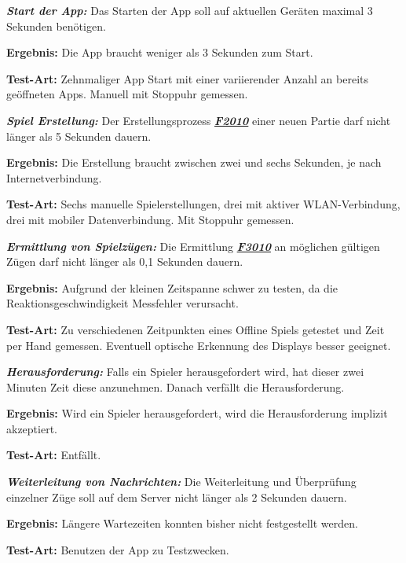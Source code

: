 \documentclass[parskip=full]{scrartcl}
\begin{document}
\begin{description}
	
	\item[NF1010] \textbf{\textit{Start der App: }} Das Starten der App soll auf aktuellen Geräten maximal 3 Sekunden benötigen. 
	\item \textbf{Ergebnis: } Die App braucht weniger als 3 Sekunden zum Start.
	\item \textbf{Test-Art: } Zehnmaliger App Start mit einer variierender Anzahl an bereits geöffneten Apps. Manuell mit Stoppuhr gemessen.
	
	\item[NF1020] \textbf{\textit{Spiel Erstellung: }} Der Erstellungsprozess \hyperlink{F2010}{\textbf{\textit{F2010}}} einer neuen Partie darf nicht länger als 5 Sekunden dauern.
	\item \textbf{Ergebnis: } Die Erstellung braucht zwischen zwei und sechs Sekunden, je nach Internetverbindung.
	\item \textbf{Test-Art: } Sechs manuelle Spielerstellungen, drei mit aktiver WLAN-Verbindung, drei mit mobiler Datenverbindung. Mit Stoppuhr gemessen.
	
	\item[NF1030] \textbf{\textit{Ermittlung von Spielzügen: }} Die Ermittlung \hyperlink{F3010}{\textbf{\textit{F3010}}} an möglichen gültigen Zügen darf nicht länger als 0,1 Sekunden dauern.
	\item \textbf{Ergebnis: } Aufgrund der kleinen Zeitspanne schwer zu testen, da die Reaktionsgeschwindigkeit Messfehler verursacht.
	\item \textbf{Test-Art: } Zu verschiedenen Zeitpunkten eines Offline Spiels getestet und Zeit per Hand gemessen. Eventuell optische Erkennung des Displays besser geeignet.
	
	\item[NF1040] \textbf{\textit{Herausforderung: }} Falls ein Spieler herausgefordert wird, hat dieser zwei Minuten Zeit diese anzunehmen. Danach verfällt die Herausforderung. 
	\item \textbf{Ergebnis: } Wird ein Spieler herausgefordert, wird die Herausforderung implizit akzeptiert.
	\item \textbf{Test-Art: } Entfällt.
	
	\item[NF1050] \textbf{\textit{Weiterleitung von Nachrichten: }} Die Weiterleitung und Überprüfung einzelner Züge soll auf dem Server nicht länger als 2 Sekunden dauern.
	\item \textbf{Ergebnis: } Längere Wartezeiten konnten bisher nicht festgestellt werden.
	\item \textbf{Test-Art: } Benutzen der App zu Testzwecken.
	

\end{description}
\end{document}
